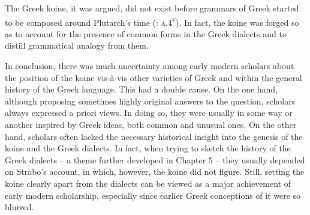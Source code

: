 \documentclass[output=paper]{langsci/langscibook}
\begin{document}
The Greek koine, it was argued, did not exist before grammars of Greek started to be composed around Plutarch’s time (\citealt{KirchmaierThryllitsch1709}: \textsc{a.4}\textsc{\textsuperscript{v}}). In fact, the koine was forged so as to account for the presence of common forms in the Greek dialects and to distill grammatical analogy from them.

In conclusion, there was much uncertainty among early modern scholars about the position of the koine vis-à-vis other varieties of Greek and within the general history of the Greek language. This had a double cause. On the one hand, although proposing sometimes highly original answers to the question, scholars always expressed a priori views. In doing so, they were usually in some way or another inspired by Greek ideas, both common and unusual ones. On the other hand, scholars often lacked the necessary historical insight into the genesis of the koine and the Greek dialects. In fact, when trying to sketch the history of the Greek dialects – a theme further developed in Chapter 5 – they usually depended on Strabo’s account, in which, however, the koine did not figure. Still, setting the koine clearly apart from the dialects can be viewed as a major achievement of early modern scholarship, especially since earlier Greek conceptions of it were so blurred.
\end{document}
